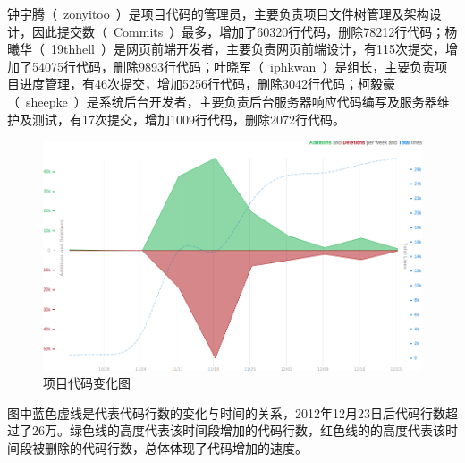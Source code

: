 钟宇腾（~zonyitoo~）是项目代码的管理员，主要负责项目文件树管理及架构设计，因此提交数（~Commits~）最多，增加了60320行代码，删除78212行代码；杨曦华（~19thhell~）是网页前端开发者，主要负责网页前端设计，有115次提交，增加了54075行代码，删除9893行代码；叶晓军（~iphkwan~）是组长，主要负责项目进度管理，有46次提交，增加5256行代码，删除3042行代码；柯毅豪（~sheepke~）是系统后台开发者，主要负责后台服务器响应代码编写及服务器维护及测试，有17次提交，增加1009行代码，删除2072行代码。

\begin{figure}[H]
   \centering \includegraphics[width=\textwidth]{img/code_freq.png}
   \caption{项目代码变化图}
\end{figure}

图中蓝色虚线是代表代码行数的变化与时间的关系，2012年12月23日后代码行数超过了26万。绿色线的高度代表该时间段增加的代码行数，红色线的的高度代表该时间段被删除的代码行数，总体体现了代码增加的速度。
